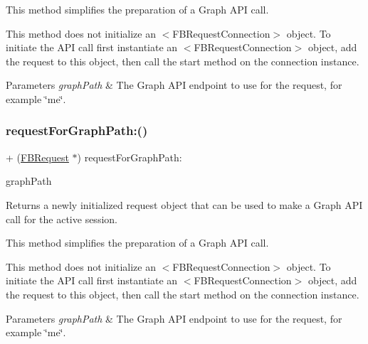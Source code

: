 This method simplifies the preparation of a Graph A\+PI call.

This method does not initialize an $<$\+F\+B\+Request\+Connection$>$ object. To initiate the A\+PI call first instantiate an $<$\+F\+B\+Request\+Connection$>$ object, add the request to this object, then call the {\ttfamily start} method on the connection instance.


\begin{DoxyParams}{Parameters}
{\em graph\+Path} & The Graph A\+PI endpoint to use for the request, for example \char`\"{}me\char`\"{}. \\
\hline
\end{DoxyParams}
\mbox{\label{interfaceFBRequest_a33356f35896b2f50d96ed24c8ddf5841}} 
\subsubsection{\texorpdfstring{request\+For\+Graph\+Path\+:()}{requestForGraphPath:()}\hspace{0.1cm}{\footnotesize\ttfamily [5/5]}}
{\footnotesize\ttfamily + (\hyperlink{interfaceFBRequest}{F\+B\+Request} $\ast$) request\+For\+Graph\+Path\+: \begin{DoxyParamCaption}\item[{(N\+S\+String $\ast$)}]{graph\+Path }\end{DoxyParamCaption}}

Returns a newly initialized request object that can be used to make a Graph A\+PI call for the active session.

This method simplifies the preparation of a Graph A\+PI call.

This method does not initialize an $<$\+F\+B\+Request\+Connection$>$ object. To initiate the A\+PI call first instantiate an $<$\+F\+B\+Request\+Connection$>$ object, add the request to this object, then call the {\ttfamily start} method on the connection instance.


\begin{DoxyParams}{Parameters}
{\em graph\+Path} & The Graph A\+PI endpoint to use for the request, for example \char`\"{}me\char`\"{}. \\
\hline
\end{DoxyParams}
\mbox{\label{interfaceFBRequest_a1a8fb083c2d09cbbc5ae9afd33e2381f}} 
